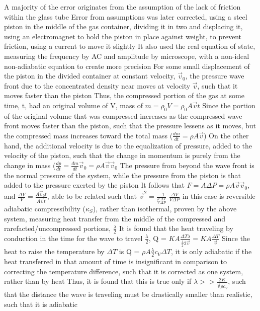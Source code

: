 \documentclass[11 pt, twoside]{article}
\newenvironment{outline*}
{
	\begin{outline}[enumerate]
	}
	{\end{outline}
}
\begin{document}
\begin{outline*}
\2 A majority of the error originates from the assumption of the lack of friction within the glass tube
\3 Error from assumptions was later corrected, using a steel piston in the middle of the gas container, dividing it in two and displacing it, using an electromagnet to hold the piston in place against weight, to prevent friction, using a current to move it slightly
\3 It also used the real equation of state, measuring the frequency by AC and amplitude by microscope, with a non-ideal non-adiabatic equation to create more precision
\2 For some small displacement of the piston in the divided container at constant velocity, $\vec{v}_0$, the pressure wave front due to the concentrated density near moves at velocity $\vec{v}$, such that it moves faster than the piston
\3 Thus, the compressed portion of the gas at some time, t, had an original volume of V, mass of $m = \rho_0 V = \rho_0 A \vec{v} t$
\3 Since the portion of the original volume that was compressed increases as the compressed wave front moves faster than the piston, such that the pressure lessens as it moves, but the compressed mass increases toward the total mass ($\frac{dm}{dt} = \rho A\vec{v}$)
\3 On the other hand, the additional velocity is due to the equalization of pressure, added to the velocity of the piston, such that the change in momentum is purely from the change in mass ($\frac{dp}{dt} = \frac{dm}{dt} \vec{v}_0 = \rho A \vec{v} \vec{v}_0$
\3 The pressure from beyond the wave front is the normal pressure of the system, while the pressure from the piston is that added to the pressure exerted by the piston
\3 It follows that $F = A\Delta P = \rho A \vec{v} \vec{v}_0$, and $\frac{\Delta V}{V} = \frac{A\vec{v}_0 t}{A \vec{v} t}$, able to be related such that $\vec{v}^2 = \frac{-1}{\frac{\rho}{V}\frac{\Delta V}{\Delta P}}$
\4 $\frac{\Delta V}{V \Delta P}$ in this case is reversible adiabatic compressibility ($\kappa_S$), rather than isothermal, proven by the above system, measuring heat transfer from the middle of the compressed and rarefacted/uncompressed portions, $\frac{\lambda}{2}$
\4 It is found that the heat traveling by conduction in the time for the wave to travel $\frac{\lambda}{2}$, Q = $KA\frac{\Delta T \lambda}{\frac{\lambda}{2}2\vec{v}} = KA\frac{\Delta T}{\vec{v}}$
\4 Since the heat to raise the temperature by $\Delta T$ is Q = $\rho A \frac{\lambda}{2}c_V\Delta T$, it is only adiabatic if the heat transferred in that amount of time is insignificant in comparison to correcting the temperature difference, such that it is corrected as one system, rather than by heat
\4 Thus, it is found that this is true only if $\lambda >> \frac{2K}{\vec{v}\rho c_V}$, such that the distance the wave is traveling must be drastically smaller than realistic, such that it is adiabatic

\end{outline*}
\end{document}
